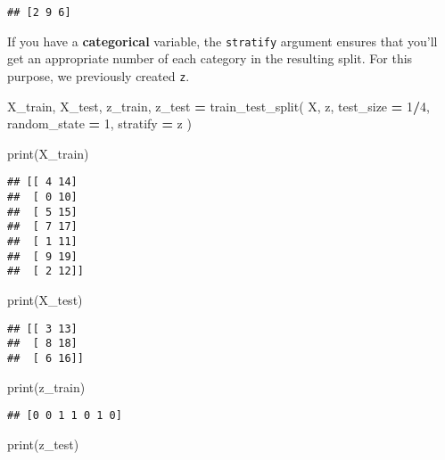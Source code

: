 \documentclass[
]{book}
\newenvironment{Shaded}{\begin{snugshade}}{\end{snugshade}}
\newcommand{\BuiltInTok}[1]{#1}
\newcommand{\DecValTok}[1]{\textcolor[rgb]{0.00,0.00,0.81}{#1}}
\newcommand{\NormalTok}[1]{#1}
\newcommand{\OperatorTok}[1]{\textcolor[rgb]{0.81,0.36,0.00}{\textbf{#1}}}
\begin{document}
\begin{verbatim}
## [2 9 6]
\end{verbatim}

If you have a \textbf{categorical} variable, the \texttt{stratify} argument ensures
that you'll get an appropriate number of each category in the resulting split.
For this purpose, we previously created \texttt{z}.

\begin{Shaded}
\begin{Highlighting}[]
\NormalTok{X\_train, X\_test, z\_train, z\_test }\OperatorTok{=}\NormalTok{ train\_test\_split(}
\NormalTok{  X, z, test\_size }\OperatorTok{=} \DecValTok{1}\OperatorTok{/}\DecValTok{4}\NormalTok{, random\_state }\OperatorTok{=} \DecValTok{1}\NormalTok{, stratify }\OperatorTok{=}\NormalTok{ z}
\NormalTok{)}
\end{Highlighting}
\end{Shaded}

\begin{Shaded}
\begin{Highlighting}[]
\BuiltInTok{print}\NormalTok{(X\_train)}
\end{Highlighting}
\end{Shaded}

\begin{verbatim}
## [[ 4 14]
##  [ 0 10]
##  [ 5 15]
##  [ 7 17]
##  [ 1 11]
##  [ 9 19]
##  [ 2 12]]
\end{verbatim}

\begin{Shaded}
\begin{Highlighting}[]
\BuiltInTok{print}\NormalTok{(X\_test)}
\end{Highlighting}
\end{Shaded}

\begin{verbatim}
## [[ 3 13]
##  [ 8 18]
##  [ 6 16]]
\end{verbatim}

\begin{Shaded}
\begin{Highlighting}[]
\BuiltInTok{print}\NormalTok{(z\_train)}
\end{Highlighting}
\end{Shaded}

\begin{verbatim}
## [0 0 1 1 0 1 0]
\end{verbatim}

\begin{Shaded}
\begin{Highlighting}[]
\BuiltInTok{print}\NormalTok{(z\_test)}
\end{Highlighting}
\end{Shaded}
\end{document}
